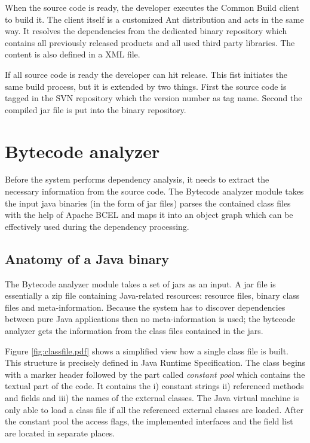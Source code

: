 When the source code is ready, the developer executes the Common Build client to
build it. The client itself is a customized Ant distribution and acts in the
same way. It resolves the dependencies from the dedicated binary repository
which contains all previously released products and all used third party
libraries. The content is also defined in a XML file.

If all source code is ready the developer can hit release. This fist initiates
the same build process, but it is extended by two things. First the source code
is tagged in the SVN repository which the version number as tag name. Second the
compiled jar file is put into the binary repository. 

\section{Bytecode analyzer}
Before the system performs dependency analysis, it needs to extract the
necessary information from the source code.
The Bytecode analyzer module takes the input java binaries (in the form of jar
files) parses the contained class files with the help of Apache BCEL and maps it
into an object graph which can be effectively used during the dependency
processing.


\subsection{Anatomy of a Java binary}
The Bytecode analyzer module takes a set of jars as an input. A jar file is
essentially a zip file containing Java-related resources: resource files, binary
class files and meta-information. Because the system has to discover
dependencies between pure Java applications then no meta-information is used;
the bytecode analyzer gets the information from the class files contained in the
jars.
 

Figure \autoref{fig:classfile.pdf} shows a simplified view how a single class
file is built. This structure is precisely defined in Java Runtime
Specification. The class begins with a marker header followed by the part called
\textit{constant pool} which contains the textual part of the code. It contains
the i) constant strings ii) referenced methods and fields and iii) the names of
the external classes. The Java virtual machine is only able to load a class file
if all the referenced external classes are loaded.
After the constant pool the access flags, the implemented interfaces and the
field list are located in separate places.


